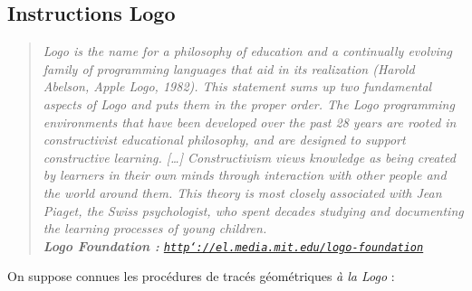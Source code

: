 \subsection{Instructions {\sc Logo}}\label{logo}
\begin{quote}\scriptsize\em 
{\em Logo is the name for a philosophy of education and 
a continually evolving family of programming languages that aid in its realization
(Harold Abelson, Apple Logo, 1982).}
This statement sums up two fundamental aspects of Logo and puts them in the proper order. 
The Logo programming environments that have been developed over the past 28 years are 
rooted in constructivist educational philosophy, and are designed to support constructive 
learning. [\ldots]
Constructivism views knowledge as being created by learners in their own minds through 
interaction with other people and the world around them. This theory is most closely 
associated with Jean Piaget, the Swiss psychologist, who spent decades studying and 
documenting the learning processes of young children.\\
\mbox{}\hfill {\rm\bf Logo Foundation :} 
\href{http://el.media.mit.edu/logo-foundation}{\tt http\char`://el.media.mit.edu/logo-foundation}
\end{quote}

On suppose connues les procédures de tracés géométriques {\em à la {\sc Logo}} :\vspace*{2mm}

